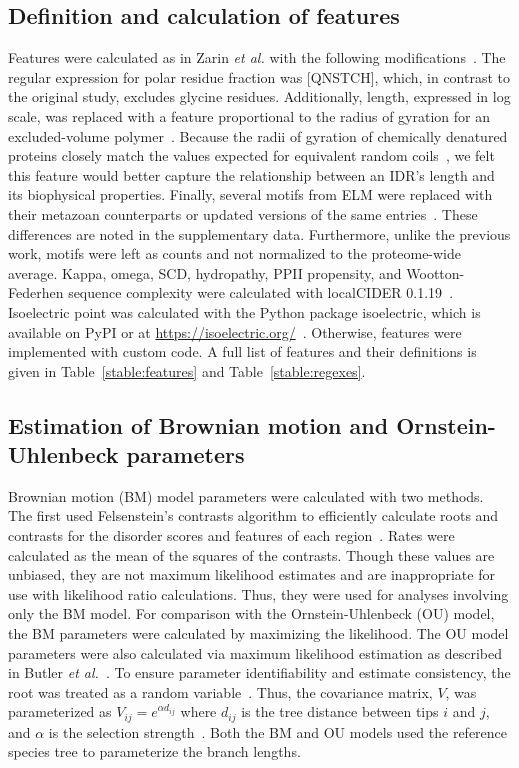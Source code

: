 \subsection{Definition and calculation of features}
Features were calculated as in Zarin \textit{et al.} with the following modifications~\cite{Zarin2019}. The regular expression for polar residue fraction was [QNSTCH], which, in contrast to the original study, excludes glycine residues. Additionally, length, expressed in log scale, was replaced with a feature proportional to the radius of gyration for an excluded-volume polymer~\cite{Flory1949}. Because the radii of gyration of chemically denatured proteins closely match the values expected for equivalent random coils~\cite{Kohn2004}, we felt this feature would better capture the relationship between an IDR's length and its biophysical properties. Finally, several motifs from ELM were replaced with their metazoan counterparts or updated versions of the same entries~\cite{Kumar2021}. These differences are noted in the supplementary data. Furthermore, unlike the previous work, motifs were left as counts and not normalized to the proteome-wide average. Kappa, omega, SCD, hydropathy, PPII propensity, and Wootton-Federhen sequence complexity were calculated with localCIDER 0.1.19~\cite{Holehouse2017}. Isoelectric point was calculated with the Python package isoelectric, which is available on PyPI or at \url{https://isoelectric.org/}~\cite{Kozlowski2016}. Otherwise, features were implemented with custom code. A full list of features and their definitions is given in Table~\ref{stable:features} and Table~\ref{stable:regexes}.

\subsection{Estimation of Brownian motion and Ornstein-Uhlenbeck parameters}
Brownian motion (BM) model parameters were calculated with two methods. The first used Felsenstein's contrasts algorithm to efficiently calculate roots and contrasts for the disorder scores and features of each region~\cite{Felsenstein1973, Felsenstein1985}. Rates were calculated as the mean of the squares of the contrasts. Though these values are unbiased, they are not maximum likelihood estimates and are inappropriate for use with likelihood ratio calculations. Thus, they were used for analyses involving only the BM model. For comparison with the Ornstein-Uhlenbeck (OU) model, the BM parameters were calculated by maximizing the likelihood. The OU model parameters were also calculated via maximum likelihood estimation as described in Butler \textit{et al.}~\cite{Butler2004}. To ensure parameter identifiability and estimate consistency, the root was treated as a random variable~\cite{Ho2013, Ho2014}. Thus, the covariance matrix, $V$, was parameterized as $V_{ij} = e^{\alpha d_{ij}}$ where $d_{ij}$ is the tree distance between tips $i$ and $j$, and $\alpha$ is the selection strength~\cite{Ho2013}. Both the BM and OU models used the reference species tree to parameterize the branch lengths.


